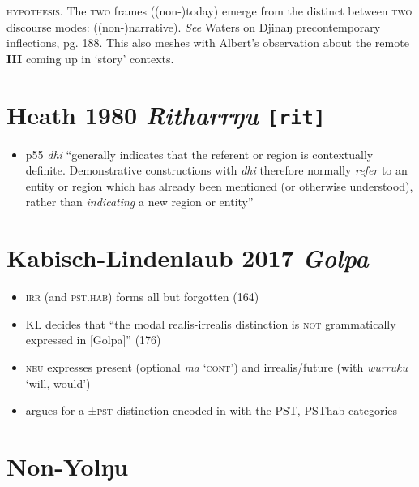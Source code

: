 \documentclass[10pt]{article}
\begin{document}
\begin{framed}
	\textsc{hypothesis.} The \textsc{two} frames ((non-)today) emerge from the distinct between \textsc{two} discourse modes: ((non-)narrative). \textit{See} Waters on Djinaŋ precontemporary inflections, pg. 188. This also meshes with Albert's observation about the remote \textbf{III} coming up in `story' contexts.
\end{framed}
	\section{Heath 1980 \textit{Ritharrŋu} \texttt{[rit]}}
	\begin{itemize}
		\item p55 \textit{\textdblhyphen dhi} ``generally indicates that the referent or region is contextually definite. Demonstrative constructions with \textit{dhi} therefore normally \textit{refer} to an entity or region which has already been mentioned (or otherwise understood), rather than \textit{indicating} a new region or entity''
	\end{itemize}
	\section{Kabisch-Lindenlaub 2017 \textit{Golpa}}
	\begin{itemize}
		\item \textsc{irr} (and \textsc{pst.hab}) forms all but forgotten (164)
		\item KL decides that ``the modal realis-irrealis distinction is \textsc{not} grammatically expressed in [Golpa]'' (176)
		\item \textsc{neu} expresses present (optional \textit{ma} `\textsc{cont'}) and irrealis/future (with \textit{wurruku} `will, would')
		\item argues for a \textsc{±pst} distinction encoded in with the PST, PSThab categories
	\end{itemize}
		\section{Non-Yolŋu}
\end{document}
